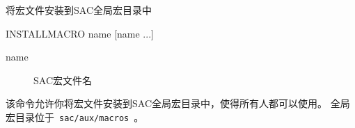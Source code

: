 \label{cmd:installmacro}

将宏文件安装到SAC全局宏目录中

\begin{SACSTX}
INSTALLMACRO name [name ...]
\end{SACSTX}

\begin{description}
\item [name] SAC宏文件名
\end{description}

该命令允许你将宏文件安装到SAC全局宏目录中，使得所有人都可以使用。
全局宏目录位于~\verb+sac/aux/macros+~。

